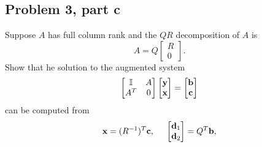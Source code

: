 \newpage
\subsection{Problem 3, part c}
Suppose $A$ has full column rank and the $QR$ decomposition of $A$ is 
\[
A = Q\begin{bmatrix}R\\0\end{bmatrix}.
\]
Show that he solution to the augmented system
\[
\begin{bmatrix}\mathbb{I} &A\\A^T &0\end{bmatrix}\begin{bmatrix}\textbf{y}\\\textbf{x}\end{bmatrix}
=
\begin{bmatrix}\textbf{b}\\\textbf{c}\end{bmatrix}
\]
can be computed from
\[
\textbf{x} = (R^{-1})^T \textbf{c}, \hspace{5mm} \begin{bmatrix}\textbf{d}_1\\\textbf{d}_2\end{bmatrix} = Q^T\textbf{b},
\]


